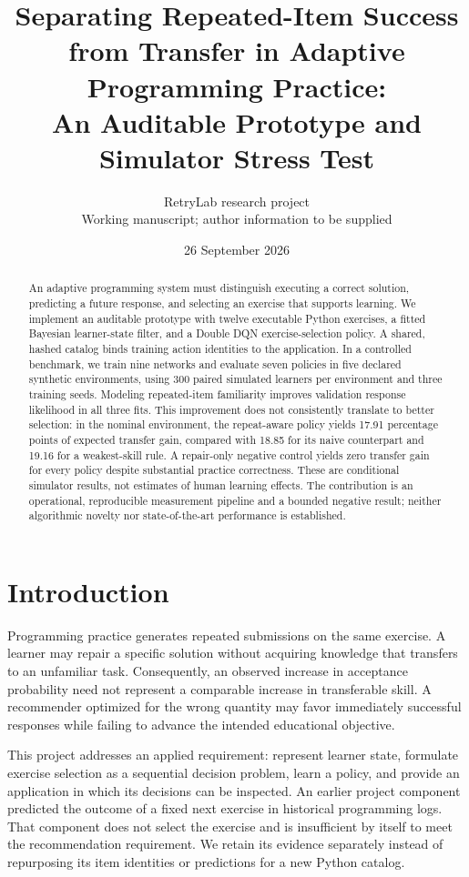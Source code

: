 \documentclass[11pt,a4paper]{article}
\title{Separating Repeated-Item Success from Transfer in Adaptive Programming Practice:\\An Auditable Prototype and Simulator Stress Test}
\author{RetryLab research project\\\small Working manuscript; author information to be supplied}
\date{26 September 2026}
\begin{document}
\maketitle
\begin{abstract}
An adaptive programming system must distinguish executing a correct solution, predicting a future response, and selecting an exercise that supports learning. We implement an auditable prototype with twelve executable Python exercises, a fitted Bayesian learner-state filter, and a Double DQN exercise-selection policy. A shared, hashed catalog binds training action identities to the application. In a controlled benchmark, we train nine networks and evaluate seven policies in five declared synthetic environments, using 300 paired simulated learners per environment and three training seeds. Modeling repeated-item familiarity improves validation response likelihood in all three fits. This improvement does not consistently translate to better selection: in the nominal environment, the repeat-aware policy yields 17.91 percentage points of expected transfer gain, compared with 18.85 for its naive counterpart and 19.16 for a weakest-skill rule. A repair-only negative control yields zero transfer gain for every policy despite substantial practice correctness. These are conditional simulator results, not estimates of human learning effects. The contribution is an operational, reproducible measurement pipeline and a bounded negative result; neither algorithmic novelty nor state-of-the-art performance is established.
\end{abstract}

\section{Introduction}
Programming practice generates repeated submissions on the same exercise. A learner may repair a specific solution without acquiring knowledge that transfers to an unfamiliar task. Consequently, an observed increase in acceptance probability need not represent a comparable increase in transferable skill. A recommender optimized for the wrong quantity may favor immediately successful responses while failing to advance the intended educational objective.

This project addresses an applied requirement: represent learner state, formulate exercise selection as a sequential decision problem, learn a policy, and provide an application in which its decisions can be inspected. An earlier project component predicted the outcome of a fixed next exercise in historical programming logs. That component does not select the exercise and is insufficient by itself to meet the recommendation requirement. We retain its evidence separately instead of repurposing its item identities or predictions for a new Python catalog.
\end{document}
